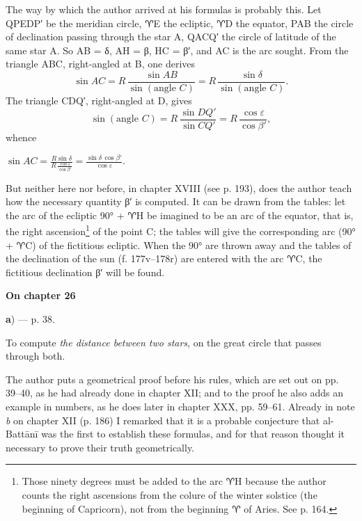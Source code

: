 \documentclass[11pt]{article}
\newcommand{\Pg}[1]{\marginpar{\footnotesize\color{gray}#1}}
\newcommand{\UnitHead}[2]{\par\setcounter{footnoteT}{0}\needspace{8\baselineskip}\bigskip\pdfbookmark[1]{#1}{unit-#2}\hypertarget{EN-#2}{}%
 {\large\bfseries\interlinepenalty=10000 #1\par}\nobreak\medskip}
\begin{document}
\par \Pg{I 200}The way by which the author arrived at his formulas is probably this. Let QPEDP′ be the meridian circle, {\MoonFont\upshape ♈}E the ecliptic, {\MoonFont\upshape ♈}D the equator, PAB the circle of declination passing through the star A, QACQ′ the circle of latitude of the same star A. So AB = {\greekfont δ}, AH = {\greekfont β}, HC = {\greekfont β}′, and AC is the arc sought. From the triangle ABC, right-angled at B, one derives \[ \sin AC = R\,\frac{\sin AB}{\sin(\text{angle } C)} = R\,\frac{\sin\delta}{\sin(\text{angle } C)}. \] The triangle CDQ′, right-angled at D, gives \[ \sin(\text{angle } C) = R\,\frac{\sin DQ'}{\sin CQ'} = R\,\frac{\cos\varepsilon}{\cos\beta'}, \] whence \par\noindent\hspace*{1.5em}$\displaystyle \sin AC = \frac{R\sin\delta}{R\,\frac{\cos\varepsilon}{\cos\beta'}} = \frac{\sin\delta\,\cos\beta'}{\cos\varepsilon}.$\par But neither here nor before, in chapter XVIII (see p. 193), does the author teach how the necessary quantity {\greekfont β}′ is computed. It can be drawn from the tables: let the arc of the ecliptic 90° + {\MoonFont\upshape ♈}H be imagined to be an arc of the equator, that is, the right ascension\footnote{Those ninety degrees must be added to the arc {\MoonFont\upshape ♈}H because the author counts the right ascensions from the colure of the winter solstice (the beginning of Capricorn), not from the beginning {\MoonFont\upshape ♈} of Aries. See p. 164.} of the point C; the tables will give the corresponding arc (90° + {\MoonFont\upshape ♈}C) of the fictitious ecliptic. When the 90° are thrown away and the tables of the declination of the sun (f. 177v–178r) are entered with the arc {\MoonFont\upshape ♈}C, the fictitious declination {\greekfont β}′ will be found.\par
\UnitHead{On chapter 26}{A26}
\par\begin{center}\textbf{a}) — p. 38.\end{center}
\par To compute \emph{the distance between two stars}, on the great circle that passes through both.\par
\par The author puts a geometrical proof before his rules, which are set out on pp. 39–40, as he had already done in chapter XII; and to the proof he also adds an example in numbers, as he does later in chapter XXX, pp. 59–61. Already in note \emph{b} on chapter XII (p. 186) I remarked that it is a probable conjecture that al-Battānī was the first to establish these formulas, and for that reason thought it necessary to prove their truth geometrically.\par
\end{document}
